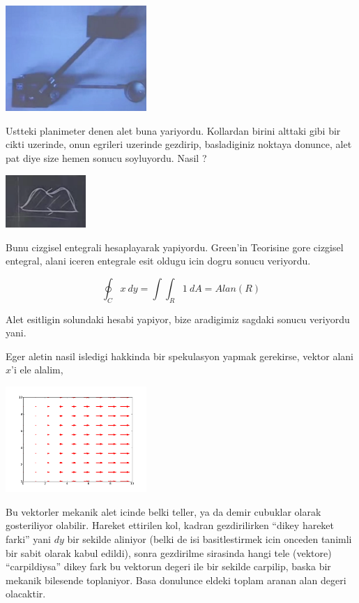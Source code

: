 \documentclass[12pt,fleqn]{article}
\begin{document}
\includegraphics[height=4cm]{22_9.png}

Ustteki planimeter denen alet buna yariyordu. Kollardan birini alttaki gibi
bir cikti uzerinde, onun egrileri uzerinde gezdirip, basladiginiz noktaya
donunce, alet pat diye size hemen sonucu soyluyordu. Nasil ?

\includegraphics[height=2cm]{22_10.png}

Bunu cizgisel entegrali hesaplayarak yapiyordu. Green'in Teorisine gore
cizgisel entegral, alani iceren entegrale esit oldugu icin dogru sonucu
veriyordu.

\[ \oint_C x \ dy  = \int \int_R 1 \ dA = Alan(R) \]

Alet esitligin solundaki hesabi yapiyor, bize aradigimiz sagdaki sonucu
veriyordu yani. 

Eger aletin nasil isledigi hakkinda bir spekulasyon yapmak gerekirse,
vektor alani $x$'i ele alalim, 

\includegraphics[height=4cm]{field_x.png}

Bu vektorler mekanik alet icinde belki teller, ya da demir cubuklar olarak
gosteriliyor olabilir. Hareket ettirilen kol, kadran gezdirilirken ``dikey
hareket farki'' yani $dy$ bir sekilde aliniyor (belki de isi basitlestirmek
icin onceden tanimli bir sabit olarak kabul edildi), sonra gezdirilme
sirasinda hangi tele (vektore) ``carpildiysa'' dikey fark bu vektorun
degeri ile bir sekilde carpilip, baska bir mekanik bilesende
toplaniyor. Basa donulunce eldeki toplam aranan alan degeri olacaktir.
\end{document}
